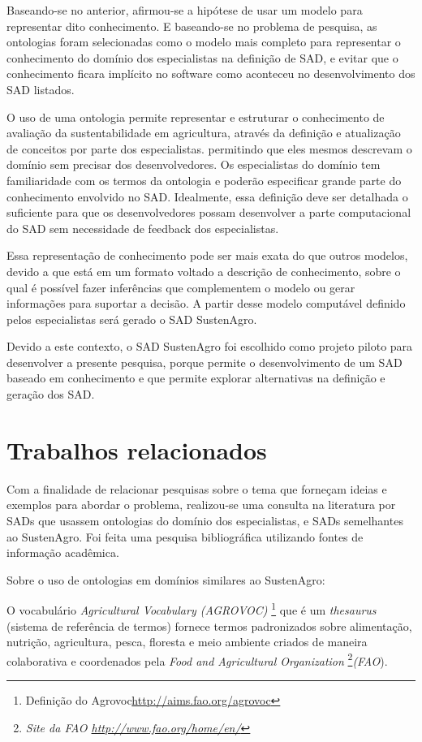 Baseando-se no anterior, afirmou-se a hipótese de usar um modelo para
representar dito conhecimento. E baseando-se no problema de pesquisa,
as ontologias foram selecionadas como o modelo mais completo para
representar o conhecimento do domínio dos especialistas na definição
de SAD, e evitar que o conhecimento ficara implícito no software como
aconteceu no desenvolvimento dos SAD listados.

O uso de uma ontologia permite representar e estruturar o conhecimento
de avaliação da sustentabilidade em agricultura, através da definição
e atualização de conceitos por parte dos especialistas. permitindo
que eles mesmos descrevam o domínio sem precisar dos desenvolvedores.
Os especialistas do domínio tem familiaridade com os termos da ontologia
e poderão especificar grande parte do conhecimento envolvido no SAD.
Idealmente, essa definição deve ser detalhada o suficiente para que
os desenvolvedores possam desenvolver a parte computacional do SAD
sem necessidade de \foreignlanguage{english}{feedback} dos especialistas.

Essa representação de conhecimento pode ser mais exata do que outros
modelos, devido a que está em um formato voltado a descrição de conhecimento,
sobre o qual é possível fazer inferências que complementem o modelo
ou gerar informações para suportar a decisão. A partir desse modelo
computável definido pelos especialistas será gerado o SAD SustenAgro. 

Devido a este contexto, o SAD SustenAgro foi escolhido como projeto
piloto para desenvolver a presente pesquisa, porque permite o desenvolvimento
de um SAD baseado em conhecimento e que permite explorar alternativas
na definição e geração dos SAD.

\section{Trabalhos relacionados}

Com a finalidade de relacionar pesquisas sobre o tema que forneçam
ideias e exemplos para abordar o problema, realizou-se uma consulta
na literatura por SADs que usassem ontologias do domínio dos especialistas,
e SADs semelhantes ao SustenAgro. Foi feita uma pesquisa bibliográfica
utilizando fontes de informação acadêmica.

Sobre o uso de ontologias em domínios similares ao SustenAgro:

O vocabulário\emph{ }\foreignlanguage{english}{\emph{Agricultural
Vocabulary (AGROVOC)}}
\footnote{Definição do Agrovoc\url{http://aims.fao.org/agrovoc}}
que é um \foreignlanguage{english}{\emph{thesaurus}} (sistema de referência
de termos) fornece termos padronizados sobre alimentação, nutrição,
agricultura, pesca, floresta e meio ambiente criados de maneira colaborativa
e coordenados pela \foreignlanguage{english}{\emph{Food and Agricultural
Organization}}\emph{ }\footnote{\emph{Site da FAO \url{http://www.fao.org/home/en/}}}\emph{(FAO}). 

